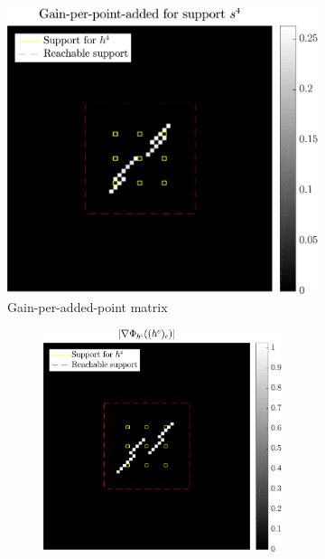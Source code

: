 \begin{figure}[!ht]\centering
\begin{subfigure}[b]{0.49\linewidth}\centering
\includegraphics[width=\linewidth]{figures/xp_grad_iterations/xp_128x128_sc2_angl1_K3_S3_node4_objmatrix_bestvalues.pdf}
\caption{Gain-per-added-point matrix}
\end{subfigure}
\begin{subfigure}[b]{0.49\linewidth}\centering
	\begin{subfigure}[b]{0.49\linewidth}\centering
	\includegraphics[width=\linewidth]{figures/xp_grad_iterations/xp_128x128_sc2_angl1_K3_S3_node4_iter1_partgrad4_bestvalues.pdf}

\end{subfigure}
\end{subfigure}
\end{figure}
